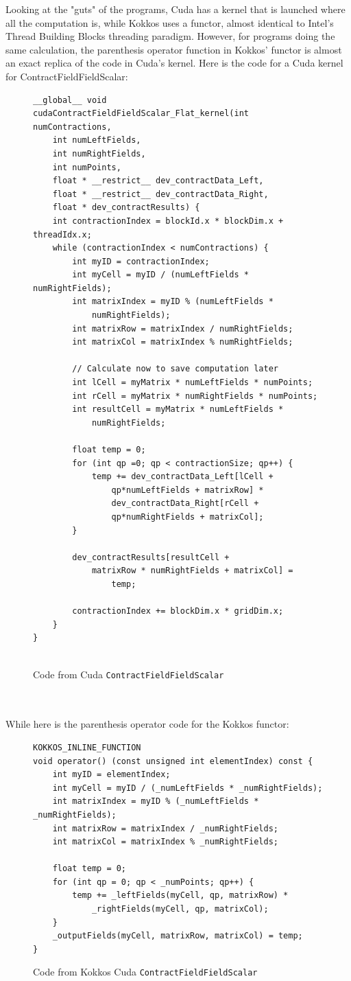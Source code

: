 Looking at the "guts" of the programs, Cuda has a kernel that is launched where all the computation is, while Kokkos uses a functor, almost identical to Intel's Thread Building Blocks threading paradigm. However, for programs doing the same calculation, the parenthesis operator function in Kokkos' functor is almost an exact replica of the code in Cuda's kernel. Here is the code for a Cuda kernel for ContractFieldFieldScalar: \\
\begin{figure}[htb]
	\begin{lstlisting}
__global__ void
cudaContractFieldFieldScalar_Flat_kernel(int numContractions,
	int numLeftFields,
	int numRightFields,
	int numPoints,
	float * __restrict__ dev_contractData_Left,
	float * __restrict__ dev_contractData_Right,
	float * dev_contractResults) {
	int contractionIndex = blockId.x * blockDim.x + threadIdx.x;
	while (contractionIndex < numContractions) {
		int myID = contractionIndex;
		int myCell = myID / (numLeftFields * numRightFields);
		int matrixIndex = myID % (numLeftFields * 
			numRightFields);
		int matrixRow = matrixIndex / numRightFields;
		int matrixCol = matrixIndex % numRightFields;
		
		// Calculate now to save computation later
		int lCell = myMatrix * numLeftFields * numPoints;
		int rCell = myMatrix * numRightFields * numPoints;
		int resultCell = myMatrix * numLeftFields * 
			numRightFields;
		
		float temp = 0;
		for (int qp =0; qp < contractionSize; qp++) {
			temp += dev_contractData_Left[lCell + 
				qp*numLeftFields + matrixRow] *
				dev_contractData_Right[rCell + 
				qp*numRightFields + matrixCol];
		}

		dev_contractResults[resultCell + 
			matrixRow * numRightFields + matrixCol] = 
				temp;
		
		contractionIndex += blockDim.x * gridDim.x;
	}
}
	
	\end{lstlisting}
\caption{Code from Cuda \texttt{ContractFieldFieldScalar}
\label{lst:ContractFieldFieldScalar Cuda kernel}}
\end{figure} \\
\\
While here is the parenthesis operator code for the Kokkos functor: \\
\begin{figure}[htb]
	\begin{lstlisting}
KOKKOS_INLINE_FUNCTION
void operator() (const unsigned int elementIndex) const {
	int myID = elementIndex;
	int myCell = myID / (_numLeftFields * _numRightFields);
	int matrixIndex = myID % (_numLeftFields * _numRightFields);
	int matrixRow = matrixIndex / _numRightFields;
	int matrixCol = matrixIndex % _numRightFields;

	float temp = 0;
	for (int qp = 0; qp < _numPoints; qp++) {
		temp += _leftFields(myCell, qp, matrixRow) *
			_rightFields(myCell, qp, matrixCol);
	}
	_outputFields(myCell, matrixRow, matrixCol) = temp;
}
	\end{lstlisting}
\caption{Code from Kokkos Cuda \texttt{ContractFieldFieldScalar}
\label{lst:ContractFieldFieldScalar Kokkos Cuda functor}}
\end{figure}
